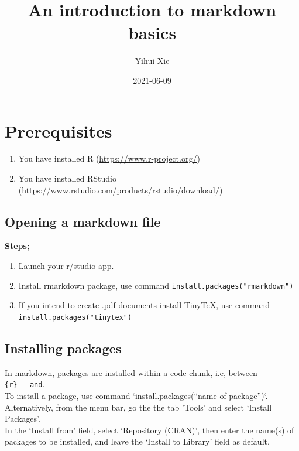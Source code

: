 \documentclass[
]{book}
\title{An introduction to markdown basics}
\author{Yihui Xie}
\date{2021-06-09}
\providecommand{\tightlist}{%
  \setlength{\itemsep}{0pt}\setlength{\parskip}{0pt}}
\begin{document}
\maketitle

{
\setcounter{tocdepth}{1}
\tableofcontents
}
\hypertarget{prerequisites}{%
\chapter{Prerequisites}\label{prerequisites}}

\begin{enumerate}
\def\labelenumi{\arabic{enumi}.}
\tightlist
\item
  You have installed R (\url{https://www.r-project.org/})
\item
  You have installed RStudio (\url{https://www.rstudio.com/products/rstudio/download/})
\end{enumerate}

\hypertarget{opening-a-markdown-file}{%
\section{Opening a markdown file}\label{opening-a-markdown-file}}

\textbf{Steps;}

\begin{enumerate}
\def\labelenumi{\arabic{enumi}.}
\tightlist
\item
  Launch your r/studio app.\\
\item
  Install rmarkdown package, use command \texttt{install.packages("rmarkdown")}\\
\item
  If you intend to create .pdf documents install TinyTeX, use command \texttt{install.packages("tinytex")}
\end{enumerate}

\hypertarget{installing-packages}{%
\section{Installing packages}\label{installing-packages}}

In markdown, packages are installed within a code chunk, i.e, between \texttt{\{r\}\ \ \ and}.\\
To install a package, use command `install.packages(``name of package'')`.\\
Alternatively, from the menu bar, go the the tab 'Tools' and select `Install Packages'.\\
In the `Install from' field, select `Repository (CRAN)', then enter the name(s) of packages to be installed, and leave the `Install to Library' field as default.
\end{document}
